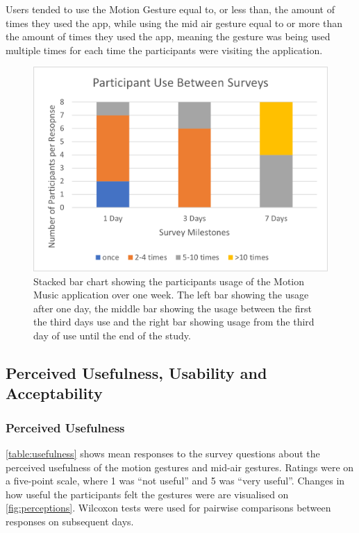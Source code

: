 \documentclass{l4proj}
\begin{document}
Users tended to use the Motion Gesture equal to, or less than, the amount of times they used the app, while using the mid air gesture equal to or more than the amount of times they used the app, meaning the gesture was being used multiple times for each time the participants were visiting the application. 

\begin{figure}[!htb]
    \centering
    \includegraphics[width=\textwidth]{images/Stacked Use.png}
        \caption{Stacked bar chart showing the participants usage of the Motion Music application over one week. The left bar showing the usage after one day, the middle bar showing the usage between the first the third days use and the right bar showing usage from the third day of use until the end of the study.}
        \label{fig:usage}
\end{figure}

\subsection{Perceived Usefulness, Usability and Acceptability}

\subsubsection{Perceived Usefulness}

\autoref{table:usefulness} shows mean responses to the survey questions about the perceived usefulness of the motion gestures and mid-air gestures. Ratings were on a five-point scale, where 1 was ``not useful'' and 5 was ``very useful''. Changes in how useful the participants felt the gestures were are visualised on \autoref{fig:perceptions}. Wilcoxon tests were used for pairwise comparisons between responses on subsequent days.
\end{document}
